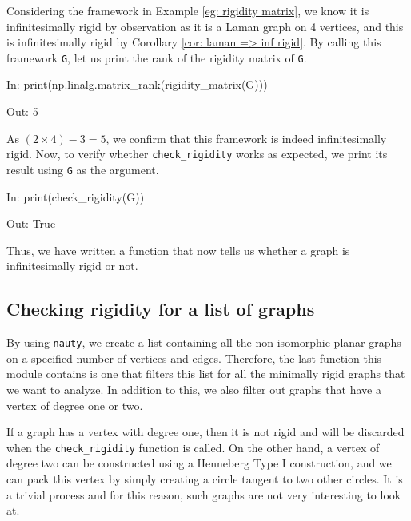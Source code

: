 \begin{flushleft}
Considering the framework in Example \ref{eg: rigidity matrix}, we know it is infinitesimally rigid by observation as it is a Laman graph on 4 vertices, and this is infinitesimally rigid by Corollary \ref{cor: laman => inf rigid}. By calling this framework \texttt{G}, let us print the rank of the rigidity matrix of \texttt{G}.
\end{flushleft}

\begin{code}
    In: print(np.linalg.matrix_rank(rigidity_matrix(G)))

    Out: 5
\end{code}

\begin{flushleft}
As $(2 \times 4) - 3 = 5$, we confirm that this framework is indeed infinitesimally rigid. Now, to verify whether \texttt{check\_rigidity} works as expected, we print its result using \texttt{G} as the argument. 
\end{flushleft}

\begin{code}
    In: print(check_rigidity(G))

    Out: True
\end{code}

\begin{flushleft}
Thus, we have written a function that now tells us whether a graph is infinitesimally rigid or not.
\end{flushleft}

\subsection{Checking rigidity for a list of graphs}

\begin{flushleft}
By using \texttt{nauty}, we create a list containing all the non-isomorphic planar graphs on a specified number of vertices and edges. Therefore, the last function this module contains is one that filters this list for all the minimally rigid graphs that we want to analyze. In addition to this, we also filter out graphs that have a vertex of degree one or two. 
\end{flushleft}

\begin{flushleft}
If a graph has a vertex with degree one, then it is not rigid and will be discarded when the \texttt{check\_rigidity} function is called. On the other hand, a vertex of degree two can be constructed using a Henneberg Type I construction, and we can pack this vertex by simply creating a circle tangent to two other circles. It is a trivial process and for this reason, such graphs are not very interesting to look at.
\end{flushleft}

